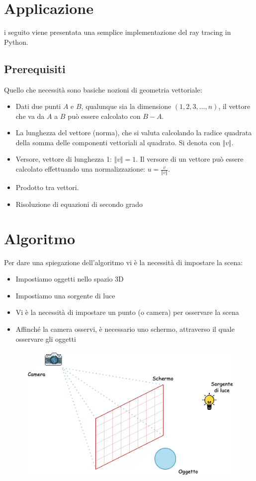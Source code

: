 \documentclass[9pt,a4paper,twoside]{tau}
\begin{document}
\section{Applicazione}
i seguito viene presentata una semplice implementazione del ray tracing in Python. 

\subsection{Prerequisiti}
Quello che necessità sono basiche nozioni di geometria vettoriale:
\begin{itemize}
	\item Dati due punti $A$ e $B$, qualunque sia la dimensione $(1, 2, 3, \dots, n)$, il vettore che va da $A$ a $B$ può essere calcolato con $B-A$.
	\item La lunghezza del vettore (norma), che si valuta calcolando la radice quadrata della somma delle componenti vettoriali al quadrato. Si denota con $\Vert v \Vert$.
	\item Versore, vettore di lunghezza 1: $\Vert v \Vert=1$. Il versore di un vettore può essere calcolato effettuando una normalizzazione: $u=\frac{v}{\Vert v \Vert}$.
	\item Prodotto tra vettori.
	\item Risoluzione di equazioni di secondo grado
\end{itemize}

\section{Algoritmo}
Per dare una spiegazione dell'algoritmo vi è la necessità di impostare la scena:
\begin{itemize}
	\item Impostiamo oggetti nello spazio 3D
	\item Impostiamo una sorgente di luce
	\item Vi è la necessità di impostare un punto (o camera) per osservare la scena
	\item Affinché la camera osservi, è necessario uno schermo, attraverso il quale osservare gli oggetti
\end{itemize} 

\begin{figure}[H]
    \centering
    \includegraphics[width=0.7\columnwidth]{Figures/14.png}
    \caption{}
    \label{fig:figure}
\end{figure}
\end{document}
